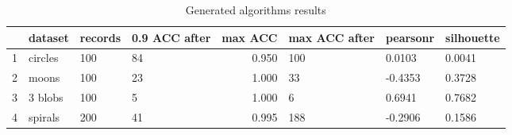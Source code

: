 \begin{table}[H]
\footnotesize
\centering
\caption{Generated algorithms results}
\label{tab:generated}
\begin{tabular}{llllrlll}
\hline
{} &  dataset & records & 0.9 ACC after &  max ACC & max ACC after & pearsonr & silhouette \\
\hline
1 &  circles &     100 &                 84 &         0.950 &                100 &   0.0103 &     0.0041 \\
2 &    moons &     100 &                 23 &         1.000 &                 33 &  -0.4353 &     0.3728 \\
3 &  3 blobs &     100 &                  5 &         1.000 &                  6 &   0.6941 &     0.7682 \\
4 &  spirals &     200 &                 41 &         0.995 &                188 &  -0.2906 &     0.1586 \\
\hline
\end{tabular}
\end{table}
